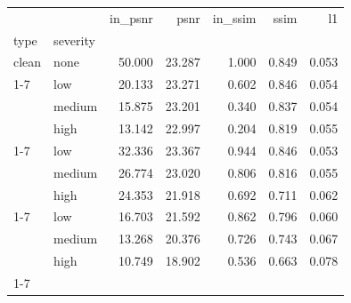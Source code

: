 \begin{tabular}{llrrrrr}
\toprule
 &  & in_psnr & psnr & in_ssim & ssim & l1 \\
type & severity &  &  &  &  &  \\
\midrule
clean & none & 50.000 & 23.287 & 1.000 & 0.849 & 0.053 \\
\cline{1-7}
\multirow[t]{3}{*}{salt_pepper} & low & 20.133 & 23.271 & 0.602 & 0.846 & 0.054 \\
 & medium & 15.875 & 23.201 & 0.340 & 0.837 & 0.054 \\
 & high & 13.142 & 22.997 & 0.204 & 0.819 & 0.055 \\
\cline{1-7}
\multirow[t]{3}{*}{blur} & low & 32.336 & 23.367 & 0.944 & 0.846 & 0.053 \\
 & medium & 26.774 & 23.020 & 0.806 & 0.816 & 0.055 \\
 & high & 24.353 & 21.918 & 0.692 & 0.711 & 0.062 \\
\cline{1-7}
\multirow[t]{3}{*}{occlusion} & low & 16.703 & 21.592 & 0.862 & 0.796 & 0.060 \\
 & medium & 13.268 & 20.376 & 0.726 & 0.743 & 0.067 \\
 & high & 10.749 & 18.902 & 0.536 & 0.663 & 0.078 \\
\cline{1-7}
\bottomrule
\end{tabular}
